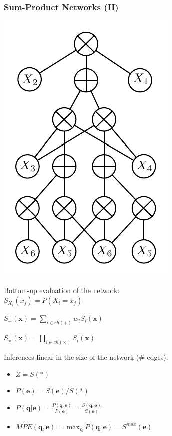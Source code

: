 \documentclass[xcolor={usenames,dvipsnames,svgnames}, compress]{beamer}
\begin{document}
\begin{frame}
  \frametitle{Sum-Product Networks (II)}
  \begin{minipage}{0.45\linewidth}
    \includegraphics[width=0.8\linewidth]{figures/spn-long}
  \end{minipage}\begin{minipage}{0.55\linewidth}
    \footnotesize
    Bottom-up evaluation of the network: \\

    $S_{X_i}(x_j)=P(X_i=x_j)$
    
    $S_{+}(\mathbf{x})=\sum\limits_{i\in ch(+)}w_{i}S_{i}(\mathbf{x})$

    $S_{\times}(\mathbf{x})=\prod\limits_{i\in
      ch(\times)}S_{i}(\mathbf{x})$
    
    Inferences linear in the size of the network (\# edges):
    \begin{itemize}
    \item $Z = S(*)$
    \item $P(\mathbf{e}) = S(\mathbf{e})/S(*)$
    \item $P(\mathbf{q}| \mathbf{e}) = \frac{P(\mathbf{q},
        \mathbf{e})}{P(\mathbf{e})} = \frac{S(\mathbf{q},
        \mathbf{e})}{S(\mathbf{e})}$
    \item $MPE(\mathbf{q},\mathbf{e}) = \max_{\mathbf{q}}P(\mathbf{q}, \mathbf{e}) = S^{max}(\mathbf{e})$  
    \end{itemize}
     
    
    
  \end{minipage}
\end{frame}
\end{document}
